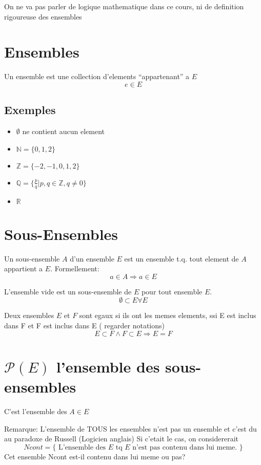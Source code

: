 \documentclass[../main.tex]{subfiles}
\begin{document}
On ne va pas parler de logique mathematique dans ce cours, ni de definition rigoureuse des ensembles

\section{Ensembles}
Un ensemble est une collection d'elements ``appartenant'' a $E$
\[ 
e \in E
\]

\subsection{Exemples}
\begin{itemize}
	\item $\emptyset$ ne contient aucun element\\
	\item $ \mathbb{N} = \{ 0,1,2 \}$\\
	\item $\mathbb{Z} = \{-2,-1,0,1,2\}$\\
	\item $\mathbb{Q} = \{ \frac{p}{q} \vert p,q \in \mathbb{Z}, q \neq 0 \}$
	\item $\mathbb{R}$
\end{itemize}
\section{Sous-Ensembles}
Un sous-ensemble $A$ d'un ensemble $E$ est un ensemble t.q. tout element de $A$ appartient a $E$.
Formellement:
\[ 
	a \in A \Rightarrow a \in E
\]

L'ensemble vide est un sous-ensemble de $E$ pour tout ensemble $E$.\\
\[ 
\emptyset \subset E \forall E
\]


Deux ensembles $E$ et $F$ sont egaux si ils ont les memes elements, ssi
E est inclus dans F et F est inclus dans E ( regarder  notations)
\[ 
E \subset F \land F \subset E \Rightarrow E = F
\]

\section{$\mathcal{P}(E)$ l'ensemble des sous-ensembles}
C'est l'ensemble des $A \in E$ 

Remarque: L'ensemble de TOUS les ensembles n'est pas un ensemble et c'est du au paradoxe de Russell (Logicien anglais)
Si c'etait le cas, on considererait
\[ 
	Ncont = \{ \text{ L'ensemble des $E$ tq $E$ n'est pas contenu dans lui meme. } \}
\]
Cet ensemble Ncont est-il contenu dans lui meme ou pas?\\
\end{document}
